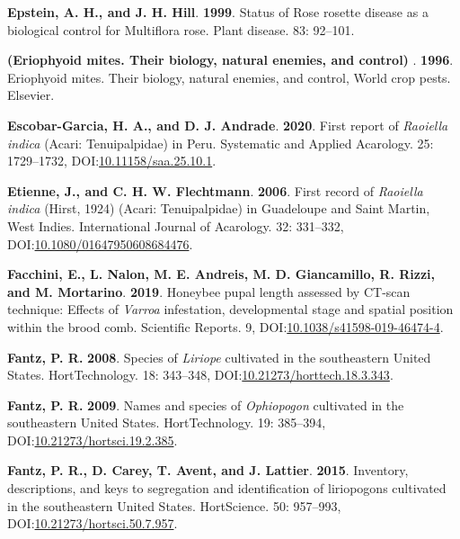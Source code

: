 \documentclass[12pt,final,CPage]{ufthesis}
\newlength{\cslhangindent}
\newenvironment{CSLReferences}[2] %
{%
	\setlength{\parindent}{0pt}
	\ifodd #1 \everypar{\setlength{\hangindent}{\cslhangindent}}\ignorespaces\fi
	\ifnum #2 > 0
	\setlength{\parskip}{#2\baselineskip}
	\fi
}%
{}
\begin{document}
{\begin{CSLReferences}{1}{0}
  \leavevmode{}%
  \textbf{Epstein, A. H., and J. H. Hill}. \textbf{1999}. Status of {Rose rosette disease} as a biological control for {Multiflora rose}. Plant disease. 83: 92--101.

  \leavevmode{}%
  \textbf{(Eriophyoid mites. Their biology, natural enemies, and control) }. \textbf{1996}. Eriophyoid mites. Their biology, natural enemies, and control, World crop pests. Elsevier.

  \leavevmode{}%
  \textbf{Escobar-Garcia, H. A., and D. J. Andrade}. \textbf{2020}. First report of {\emph{Raoiella indica}} ({Acari}: {Tenuipalpidae}) in {Peru}. Systematic and Applied Acarology. 25: 1729--1732, DOI:\href{https://doi.org/10.11158/saa.25.10.1}{10.11158/saa.25.10.1}.

  \leavevmode{}%
  \textbf{Etienne, J., and C. H. W. Flechtmann}. \textbf{2006}. First record of {\emph{Raoiella indica}} ({Hirst}, 1924) ({Acari}: {Tenuipalpidae}) in {Guadeloupe} and {Saint Martin}, {West Indies}. International Journal of Acarology. 32: 331--332, DOI:\href{https://doi.org/10.1080/01647950608684476}{10.1080/01647950608684476}.

  \leavevmode{}%
  \textbf{Facchini, E., L. Nalon, M. E. Andreis, M. D. Giancamillo, R. Rizzi, and M. Mortarino}. \textbf{2019}. Honeybee pupal length assessed by {CT}-scan technique: Effects of {\emph{Varroa}} infestation, developmental stage and spatial position within the brood comb. Scientific Reports. 9, DOI:\href{https://doi.org/10.1038/s41598-019-46474-4}{10.1038/s41598-019-46474-4}.

  \leavevmode{}%
  \textbf{Fantz, P. R.} \textbf{2008}. Species of {\emph{Liriope}} cultivated in the southeastern {United States}. {HortTechnology}. 18: 343--348, DOI:\href{https://doi.org/10.21273/horttech.18.3.343}{10.21273/horttech.18.3.343}.

  \leavevmode{}%
  \textbf{Fantz, P. R.} \textbf{2009}. Names and species of {\emph{Ophiopogon}} cultivated in the southeastern {United States}. {HortTechnology}. 19: 385--394, DOI:\href{https://doi.org/10.21273/hortsci.19.2.385}{10.21273/hortsci.19.2.385}.

  \leavevmode{}%
  \textbf{Fantz, P. R., D. Carey, T. Avent, and J. Lattier}. \textbf{2015}. Inventory, descriptions, and keys to segregation and identification of liriopogons cultivated in the southeastern {United States}. {HortScience}. 50: 957--993, DOI:\href{https://doi.org/10.21273/hortsci.50.7.957}{10.21273/hortsci.50.7.957}.


\end{CSLReferences}}
\end{document}
